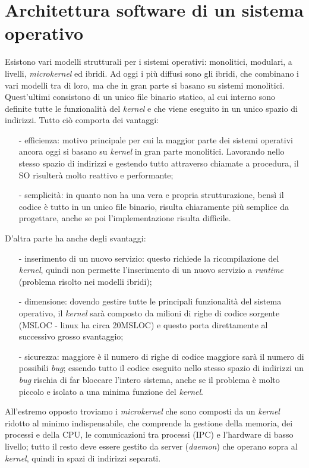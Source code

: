 \section{Architettura software di un sistema operativo}
Esistono vari modelli strutturali per i sistemi operativi: monolitici, modulari, a livelli, \textit{microkernel} ed ibridi. Ad oggi i più diffusi sono gli ibridi, che combinano i vari modelli tra di loro, ma che in gran parte si basano su sistemi monolitici. Quest'ultimi consistono di un unico file binario statico, al cui interno sono definite tutte le funzionalità del \textit{kernel} e che viene eseguito in un unico spazio di indirizzi. Tutto ciò comporta dei vantaggi: 
\begin{itemize}
	\item[-] efficienza: motivo principale per cui la maggior parte dei sistemi operativi ancora oggi si basano su \textit{kernel} in gran parte monolitici. Lavorando nello stesso spazio di indirizzi e gestendo tutto attraverso chiamate a procedura, il SO risulterà molto reattivo e performante;
	\item[-] semplicità: in quanto non ha una vera e  propria strutturazione, bensì il codice è tutto in un unico file binario, risulta chiaramente più semplice da progettare, anche se poi l'implementazione risulta difficile.
\end{itemize} 
D'altra parte ha anche degli svantaggi: 
\begin{itemize}
	\item[-] inserimento di un nuovo servizio: questo richiede la ricompilazione del \textit{kernel}, quindi non permette l'inserimento di un nuovo servizio a \textit{runtime} (problema risolto nei modelli ibridi);
	\item[-] dimensione: dovendo gestire tutte le principali funzionalità del sistema operativo, il \textit{kernel} sarà composto da milioni di righe di codice sorgente (MSLOC - linux ha circa 20MSLOC) e questo porta direttamente al successivo grosso svantaggio;
	\item[-] sicurezza: maggiore è il numero di righe di codice maggiore sarà il numero di possibili \textit{bug}; essendo tutto il codice eseguito nello stesso spazio di indirizzi un \textit{bug} rischia di far bloccare l'intero sistema, anche se il problema è molto piccolo e isolato a una minima funzione del \textit{kernel}.
\end{itemize}

All'estremo opposto troviamo i \textit{microkernel} che sono composti da un \textit{kernel} ridotto al minimo indispensabile, che comprende la gestione della memoria, dei processi e della CPU, le comunicazioni tra processi (IPC) e l'hardware di basso livello; tutto il resto deve essere gestito da server (\textit{daemon}) che operano sopra al \textit{kernel}, quindi in spazi di indirizzi separati.

